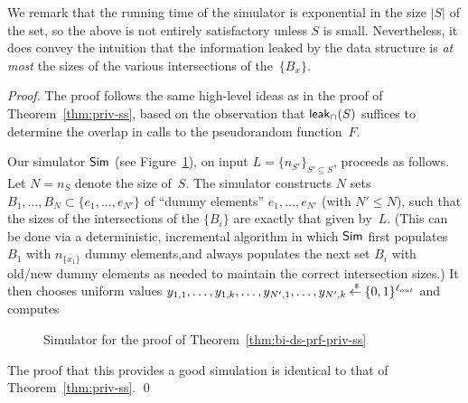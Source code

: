 We remark that the running time of the simulator is exponential in
the size $|S|$ of the set, so the above is not entirely satisfactory
unless $S$ is small. Nevertheless, it does convey the intuition that
the information leaked by the data structure is \emph{at most} the
sizes of the various intersections of the~$\{B_x\}$.

\begin{proof}
The proof follows the same high-level ideas as in the proof of
Theorem~\ref{thm:priv-ss}, based on the observation that ${\sf
leak}_\cap(S)$ suffices to determine the overlap in calls to the
pseudorandom function~$F$.

Our simulator ${\sf Sim}$ (see Figure~\ref{fig:sim-bi-ds-prf}), on input $L = \{n_{S'}\}_{S' \subseteq S}$,
proceeds as follows. Let $N = n_S$ denote the size of~$S$. The
simulator constructs $N$ sets $B_1, \ldots, B_N \subset \{e_1,
\ldots, e_{N'}\}$ of ``dummy elements'' $e_1, \ldots, e_{N'}$ (with
$N' \leq N$), such that the sizes of the intersections of the
$\{B_i\}$ are exactly that given by~$L$. (This can be done via a
deterministic, incremental algorithm in which ${\sf Sim}$ first populates
$B_1$ with $n_{\{x_1\}}$ dummy elements,and always populates the
next set $B_i$ with old/new dummy elements as needed to maintain the
correct intersection sizes.) It then chooses uniform values
$y_{1,1}, \ldots, y_{1,k}, \ldots, y_{N',1}, \ldots, y_{N',k} {\:\stackrel{{\scriptscriptstyle \hspace{0.2em}\$}} {\leftarrow}\:}
\{0,1\}^{\ell_{out}}$ and computes

\begin{figure}[th]
\centering
{}
\caption{Simulator for the proof of Theorem~\ref{thm:bi-ds-prf-priv-ss} }
\label{fig:sim-bi-ds-prf}
\end{figure}

The proof that this provides a good simulation is identical to that
of Theorem~\ref{thm:priv-ss}. \hfill\qed
\end{proof}


